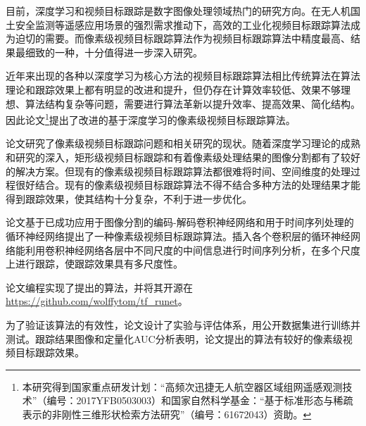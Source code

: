 
\begin{cabstract}
	目前，深度学习和视频目标跟踪是数字图像处理领域热门的研究方向。在无人机国土安全监测等遥感应用场景的强烈需求推动下，高效的工业化视频目标跟踪算法成为迫切的需要。而像素级视频目标跟踪算法作为视频目标跟踪算法中精度最高、结果最细致的一种，十分值得进一步深入研究。
	\par
	近年来出现的各种以深度学习为核心方法的视频目标跟踪算法相比传统算法在算法理论和跟踪效果上都有明显的改进和提升，但仍存在计算效率较低、效果不够理想、算法结构复杂等问题，需要进行算法革新以提升效率、提高效果、简化结构。因此论文\footnote{本研究得到国家重点研发计划：“高频次迅捷无人航空器区域组网遥感观测技术”（编号：2017YFB0503003）和国家自然科学基金：“基于标准形态与稀疏表示的非刚性三维形状检索方法研究”（编号：61672043）资助。}提出了改进的基于深度学习的像素级视频目标跟踪算法。
	\par
	论文研究了像素级视频目标跟踪问题和相关研究的现状。随着深度学习理论的成熟和研究的深入，矩形级视频目标跟踪和有着像素级处理结果的图像分割都有了较好的解决方案。但现有的像素级视频目标跟踪算法都很难将时间、空间维度的处理过程很好结合。现有的像素级视频目标跟踪算法不得不结合多种方法的处理结果才能得到跟踪效果，使其结构十分复杂，不利于进一步优化。
	\par
	论文基于已成功应用于图像分割的编码-解码卷积神经网络和用于时间序列处理的循环神经网络提出了一种像素级视频目标跟踪算法。插入各个卷积层的循环神经网络能利用卷积神经网络各层中不同尺度的中间信息进行时间序列分析，在多个尺度上进行跟踪，使跟踪效果具有多尺度性。
	\par
	论文编程实现了提出的算法，并将其开源在\url{https://github.com/wolffytom/tf_runet}。
	\par
	为了验证该算法的有效性，论文设计了实验与评估体系，用公开数据集进行训练并测试。跟踪结果图像和定量化AUC分析表明，论文提出的算法有较好的像素级视频目标跟踪效果。
\end{cabstract}

